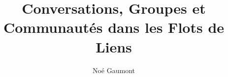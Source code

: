 \documentclass[12pt,a4paper]{book}
\author{Noé Gaumont}
\title{Conversations, Groupes et Communautés dans les Flots de Liens}
\begin{document}
\maketitle
\tableofcontents
\listoftodos
\end{document}
